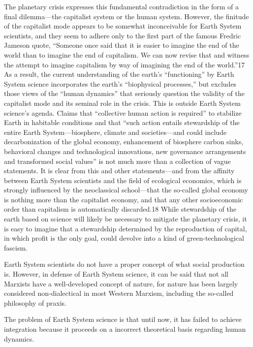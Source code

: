 \documentclass[
]{book}
\begin{document}
The planetary crisis expresses this fundamental contradiction in the form of a final dilemma---the capitalist system or the human system. However, the finitude of the capitalist mode appears to be somewhat inconceivable for Earth System scientists, and they seem to adhere only to the first part of the famous Fredric Jameson quote, ``Someone once said that it is easier to imagine the end of the world than to imagine the end of capitalism. We can now revise that and witness the attempt to imagine capitalism by way of imagining the end of the world.''17 As a result, the current understanding of the earth's ``functioning'' by Earth System science incorporates the earth's ``biophysical processes,'' but excludes those views of the ``human dynamics'' that seriously question the validity of the capitalist mode and its seminal role in the crisis. This is outside Earth System science's agenda. Claims that ``collective human action is required'' to stabilize Earth in habitable conditions and that ``such action entails stewardship of the entire Earth System---biosphere, climate and societies---and could include decarbonization of the global economy, enhancement of biosphere carbon sinks, behavioral changes and technological innovations, new governance arrangements and transformed social values'' is not much more than a collection of vague statements. It is clear from this and other statements---and from the affinity between Earth System scientists and the field of ecological economics, which is strongly influenced by the neoclassical school---that the so-called global economy is nothing more than the capitalist economy, and that any other socioeconomic order than capitalism is automatically discarded.18 While stewardship of the earth based on science will likely be necessary to mitigate the planetary crisis, it is easy to imagine that a stewardship determined by the reproduction of capital, in which profit is the only goal, could devolve into a kind of green-technological fascism.

Earth System scientists do not have a proper concept of what social production is. However, in defense of Earth System science, it can be said that not all Marxists have a well-developed concept of nature, for nature has been largely considered non-dialectical in most Western Marxism, including the so-called philosophy of praxis.

The problem of Earth System science is that until now, it has failed to achieve integration because it proceeds on a incorrect theoretical basis regarding human dynamics.
\end{document}
